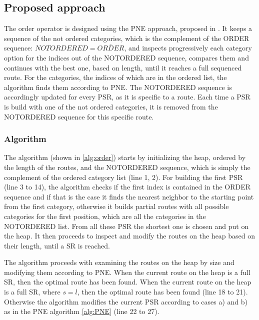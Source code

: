 \subsection{Proposed approach} 
\label{sec:approachOrder}
The order operator is designed using the PNE approach, proposed in \cite{OSR}. It keeps a sequence of the not ordered categories, which is the complement of the ORDER sequence: $NOTORDERED = \overline{ORDER}$, and inspects progressively each category option for the indices out of the NOTORDERED sequence, compares them and continues with the best one, based on length, until it reaches a full sequenced route. For the categories, the indices of which are in the ordered list, the algorithm finds them according to PNE. 
The NOTORDERED sequence is accordingly updated for every PSR, as it is specific to a route. Each time a PSR is build with one of the not ordered categories, it is removed from the NOTORDERED sequence for this specific route.

\subsubsection{Algorithm}
\label{sec:algortihmOrder}
The algorithm (shown in \ref{alg:order}) starts by initializing the heap, ordered by the length of the routes, and the NOTORDERED sequence, which is simply the complement of the ordered category list (line 1, 2). For building the first PSR (line 3 to 14), the algorithm checks if the first index is contained in the ORDER sequence and if that is the case it finds the nearest neighbor to the starting point from the first category, otherwise it builds partial routes with all possible categories for the first position, which are all the categories in the NOTORDERED list. From all these PSR the shortest one is chosen and put on the heap. It then proceeds to inspect and modify the routes on the heap based on their length, until a SR is reached. 

The algorithm proceeds with examining the routes on the heap by size and modifying them according to PNE. When the current route on the heap is a full SR, then the optimal route has been found. When the current route on the heap is a full SR, where $s = l$, then the optimal route has been found (line 18 to 21). Otherwise the algorithm modifies the current PSR according to cases a) and b) as in the PNE algorithm \ref{alg:PNE} (line 22 to 27). \newline

